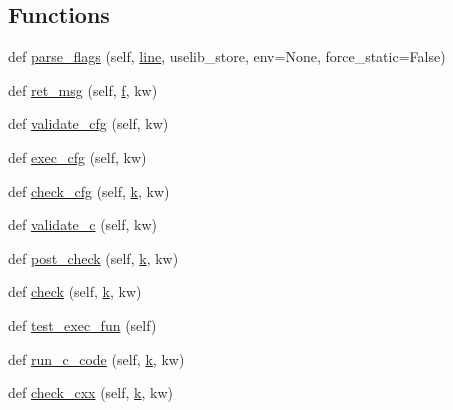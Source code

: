 \subsection*{Functions}
\begin{DoxyCompactItemize}
\item 
def \hyperlink{namespacewaflib_1_1_tools_1_1c__config_adf5bcd2436b90068916413371f93e301}{parse\+\_\+flags} (self, \hyperlink{seqread_8c_aad9ebcdde542d8b2075615388ff15a9c}{line}, uselib\+\_\+store, env=None, force\+\_\+static=False)
\item 
def \hyperlink{namespacewaflib_1_1_tools_1_1c__config_a924e6953e17a1a202a055b8766ef14f3}{ret\+\_\+msg} (self, \hyperlink{checksum_8c_ae747d72a1a803f5ff4a4b2602857d93b}{f}, kw)
\item 
def \hyperlink{namespacewaflib_1_1_tools_1_1c__config_a34a3a7a75758108d6280b678358f4775}{validate\+\_\+cfg} (self, kw)
\item 
def \hyperlink{namespacewaflib_1_1_tools_1_1c__config_af864d6c2f284deb99bc53fc66e27e02c}{exec\+\_\+cfg} (self, kw)
\item 
def \hyperlink{namespacewaflib_1_1_tools_1_1c__config_a9777baf7979ba89362dbaf66891281d9}{check\+\_\+cfg} (self, \hyperlink{rfft2d_test_m_l_8m_adc468c70fb574ebd07287b38d0d0676d}{k}, kw)
\item 
def \hyperlink{namespacewaflib_1_1_tools_1_1c__config_aa8c8896ca3170069a0f20b8a27ad2690}{validate\+\_\+c} (self, kw)
\item 
def \hyperlink{namespacewaflib_1_1_tools_1_1c__config_a007f8b5aab4b03ad5b428be9e9e56fd4}{post\+\_\+check} (self, \hyperlink{rfft2d_test_m_l_8m_adc468c70fb574ebd07287b38d0d0676d}{k}, kw)
\item 
def \hyperlink{namespacewaflib_1_1_tools_1_1c__config_a58859fd21b5419c38f4c77256ce3893b}{check} (self, \hyperlink{rfft2d_test_m_l_8m_adc468c70fb574ebd07287b38d0d0676d}{k}, kw)
\item 
def \hyperlink{namespacewaflib_1_1_tools_1_1c__config_aca45fb00c52fe9345fba913b79c465dd}{test\+\_\+exec\+\_\+fun} (self)
\item 
def \hyperlink{namespacewaflib_1_1_tools_1_1c__config_acd53ac9edce84551c4bf87b21854c6b8}{run\+\_\+c\+\_\+code} (self, \hyperlink{rfft2d_test_m_l_8m_adc468c70fb574ebd07287b38d0d0676d}{k}, kw)
\item 
def \hyperlink{namespacewaflib_1_1_tools_1_1c__config_a56e98ff4881c9fc86bdcfd0075e21967}{check\+\_\+cxx} (self, \hyperlink{rfft2d_test_m_l_8m_adc468c70fb574ebd07287b38d0d0676d}{k}, kw)
\item 

\end{DoxyCompactItemize}
